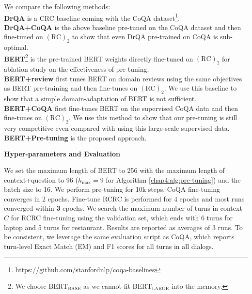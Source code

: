 We compare the following methods: \\
\textbf{DrQA} is a CRC baseline coming with the CoQA dataset\footnote{https://github.com/stanfordnlp/coqa-baselines}. \\
\textbf{DrQA+CoQA} is the above baseline pre-tuned on the CoQA dataset and then fine-tuned on $(\text{RC})_2$ to show that even DrQA pre-trained on CoQA is sub-optimal.\\
\textbf{BERT}\footnote{We choose $\text{BERT}_{\text{BASE}}$ as we cannot fit $\text{BERT}_{\text{LARGE}}$ into the memory.} is the pre-trained BERT weights directly fine-tuned on $(\text{RC})_2$ for ablation study on the effectiveness of pre-tuning.\\
\textbf{BERT+review} first tunes BERT on domain reviews using the same objectives as BERT pre-training and then fine-tunes on $(\text{RC})_2$. We use this baseline to show that a simple domain-adaptation of BERT is not sufficient.\\
\textbf{BERT+CoQA} first fine-tunes BERT on the supervised CoQA data and then fine-tunes on $(\text{RC})_2$. We use this method to show that our pre-tuning is still very competitive even compared with using this large-scale supervised data.\\
\textbf{BERT+Pre-tuning} is the proposed approach.

\textbf{Hyper-parameters and Evaluation}

We set the maximum length of BERT to 256 with the maximum length of context+question to 96 ($h_\text{max}=9$ for Algorithm \ref{chap4:alg:pre-tuning}) and the batch size to 16.
We perform pre-tuning for 10k steps. 
CoQA fine-tuning converges in 2 epochs.
Fine-tune RCRC is performed for 4 epochs and most runs converged within \textbf{3} epochs.
We search the maximum number of turns in context $C$ for RCRC fine-tuning using the validation set, which ends with 6 turns for laptop and 5 turns for restaurant.
Results are reported as averages of 3 runs.
To be consistent, we leverage the same evaluation script as CoQA, which reports 
turn-level Exact Match (EM) and F1 scores for all turns in all dialogs.

